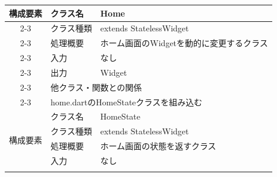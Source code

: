 \begin{table}[H]
{\begin{tabular}{|c|l|l|}
      \multirow{7}{*}{構成要素} & クラス名                                                                                & Home                                                       \\ \cline{2-3}
                            & クラス種類                                                                               & extends StatelessWidget                                    \\ \cline{2-3}
                            & 処理概要                                                                                & \multicolumn{1}{p{12cm}|}{ホーム画面のWidgetを動的に変更するクラス}         \\ \cline{2-3}
                            & 入力                                                                                  & なし                                                         \\ \cline{2-3}
                            & 出力                                                                                  & Widget                                                     \\ \cline{2-3}
                            & \multicolumn{2}{l|}{他クラス・関数との関係}                                                                                                                 \\ \cline{2-3}
                            & \multicolumn{2}{p{14cm}|}{home.dartのHomeStateクラスを組み込む}                                                                                           \\ \hline
      \multirow{7}{*}{構成要素} & クラス名                                                                                & HomeState                                                  \\ \cline{2-3}
                            & クラス種類                                                                               & extends StatelessWidget                                    \\ \cline{2-3}
                            & 処理概要                                                                                & \multicolumn{1}{p{12cm}|}{ホーム画面の状態を返すクラス}                  \\ \cline{2-3}
                            & 入力                                                                                  & なし                                                         \\ \cline{2-3}

\end{tabular}}
\end{table}
